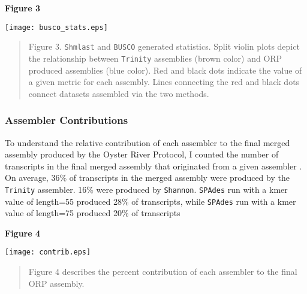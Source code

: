 \documentclass[10pt,letterpaper]{article}
\providecommand{\DIFaddtex}[1]{{\protect\color{blue}\uwave{#1}}} %
\providecommand{\DIFaddbegin}{} %
\providecommand{\DIFaddend}{} %
\providecommand{\DIFdelbegin}{} %
\providecommand{\DIFdelend}{} %
\providecommand{\DIFadd}[1]{\texorpdfstring{\DIFaddtex{#1}}{#1}} %
\newcommand{\DIFscaledelfig}{0.5}
\newlength{\DIFdelgraphicswidth} %
\newlength{\DIFdelgraphicsheight} %
\newcommand{\DIFaddincludegraphics}[2][]{{\color{blue}\fbox{\DIFOincludegraphics[#1]{#2}}}} %
\newcommand{\DIFdelincludegraphics}[2][]{%
\sbox{\DIFdelgraphicsbox}{\DIFOincludegraphics[#1]{#2}}%
\settoboxwidth{\DIFdelgraphicswidth}{\DIFdelgraphicsbox} %
\settoboxtotalheight{\DIFdelgraphicsheight}{\DIFdelgraphicsbox} %
\scalebox{\DIFscaledelfig}{%
\parbox[b]{\DIFdelgraphicswidth}{\usebox{\DIFdelgraphicsbox}\\[-\baselineskip] \rule{\DIFdelgraphicswidth}{0em}}\llap{\resizebox{\DIFdelgraphicswidth}{\DIFdelgraphicsheight}{%
\setlength{\unitlength}{\DIFdelgraphicswidth}%
\begin{picture}(1,1)%
\thicklines\linethickness{2pt} %
{\color[rgb]{1,0,0}\put(0,0){\framebox(1,1){}}}%
{\color[rgb]{1,0,0}\put(0,0){\line( 1,1){1}}}%
{\color[rgb]{1,0,0}\put(0,1){\line(1,-1){1}}}%
\end{picture}%
}\hspace*{3pt}}} %
} %
\DeclareRobustCommand{\DIFaddbegin}{\DIFOaddbegin \let\includegraphics\DIFaddincludegraphics} %
\DeclareRobustCommand{\DIFaddend}{\DIFOaddend \let\includegraphics\DIFOincludegraphics} %
\DeclareRobustCommand{\DIFdelbegin}{\DIFOdelbegin \let\includegraphics\DIFdelincludegraphics} %
\DeclareRobustCommand{\DIFdelend}{\DIFOaddend \let\includegraphics\DIFOincludegraphics} %
\begin{document}
\newpage
\DIFaddend \textbf{\DIFdelbegin %
\DIFdelend \DIFaddbegin \hypertarget{Figure 3}{Figure 3}\DIFaddend } \\
\centerline{\texttt{[image: busco\_stats.eps]}}
\begin{quote}
\DIFdelbegin %
\DIFdelend \DIFaddbegin \small{Figure 3. \texttt{Shmlast} and \texttt{BUSCO} generated statistics. Split violin plots depict the relationship between \texttt{Trinity} assemblies (brown color) and ORP produced assemblies (blue color). Red and black dots indicate the value of a given metric for each assembly. Lines connecting the red and black dots connect datasets assembled via the two methods.}
\DIFaddend \end{quote} 

\subsubsection{Assembler Contributions}

To understand the relative contribution of each assembler to the final merged assembly produced by the Oyster River Protocol, I counted the number of transcripts in the final merged assembly that originated from a given assembler \DIFaddbegin \DIFadd{(Figure 4)}\DIFaddend . On average, 36\% of transcripts in the merged assembly were produced by the \texttt{Trinity} assembler. 16\% were produced by \texttt{Shannon}. \texttt{SPAdes} run with a kmer value of length=55 produced 28\% of transcripts, while \texttt{SPAdes} run with a kmer value of length=75 produced 20\% of transcripts 

\DIFaddbegin \newpage
\DIFaddend \textbf{\DIFdelbegin %
\DIFdelend \DIFaddbegin \hypertarget{Figure 4}{Figure 4}\DIFaddend } \\
\centerline{\texttt{[image: contrib.eps]}}
\begin{quote}
\DIFdelbegin %
\DIFdelend \DIFaddbegin \small{Figure 4 describes the percent contribution of each assembler to the final ORP assembly.}
\DIFaddend \end{quote} 
\end{document}
